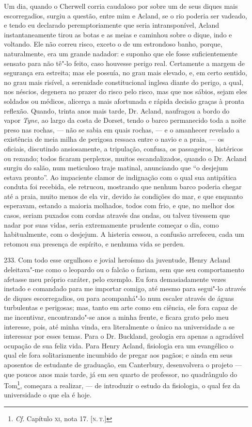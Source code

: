 Um dia, quando o Cherwell corria caudaloso por sobre um de seus diques
mais escorregadios, surgiu a questão, entre mim e Acland, se o rio
poderia ser vadeado, e tendo eu declarado peremptoriamente que seria
intransponível, Acland instantaneamente tirou as botas e as meias e
caminhou sobre o dique, indo e voltando. Ele não correu risco, exceto o
de um estrondoso banho, porque, naturalmente, era um grande nadador: e
suponho que ele fosse suficientemente sensato para não tê"-lo feito, caso
houvesse perigo real. Certamente a margem de segurança era estreita; mas
ele possuía, no grau mais elevado, e, em certo sentido, no grau mais
risível, a serenidade constitucional inglesa diante do perigo, a qual,
nos néscios, degenera no prazer do risco pelo risco, mas que nos sábios,
sejam eles soldados ou médicos, alicerça a mais afortunada e rápida
decisão graças à pronta reflexão. Quando, trinta anos mais tarde, Dr.
Acland, naufragou a bordo do vapor \emph{Tyne}, ao largo da costa de
Dorset, tendo o barco permanecido toda a noite preso nas rochas, --- não
se sabia em quais rochas, --- e o amanhecer revelado a existência de meia
milha de perigosa ressaca entre o navio e a praia, --- os oficiais,
discutindo ansiosamente, a tripulação, confusa, os passageiros,
histéricos ou rezando; todos ficaram perplexos, muitos escandalizados,
quando o Dr. Acland surgiu do salão, num meticuloso traje matinal,
anunciando que ``o desjejum estava pronto''. Ao impaciente clamor de
indignação com o qual sua antipática conduta foi recebida, ele retrucou,
mostrando que nenhum barco poderia chegar até a praia, muito menos de
ela vir, devido às condições do mar, e que enquanto esperavam, estando a
maioria molhados, todos com frio, e que, no melhor dos casos, seriam
puxados com cordas através das ondas, ou talvez tivessem que nadar por
suas vidas, seria extremamente prudente começar o dia, como
habitualmente, com o desjejum. A histeria cessou, a confusão arrefeceu,
cada um retomou sua presença de espírito, e nenhuma vida se perdeu.

233. Com todo esse orgulhoso e jovial heroísmo da juventude, Henry
Acland deleitava"-me como o leopardo ou o falcão o fariam, sem que seu
comportamento afetasse meu próprio caráter, pelo exemplo. Eu fora
demasiadamente vezes instado e comandado para me importar comigo, até
mesmo para segui"-lo através de diques escorregadios, ou para
acompanhá"-lo num escaler através de águas turbulentas e perigosas; mas,
tanto em arte como em ciência, ele fora capaz de me incentivar,
encontrando"-se anos a minha frente, e ficara grato pelo meu interesse,
pois, até minha vinda, era literalmente o único na universidade a se
interessar por esses temas. Para o Dr. Buckland, geologia era apenas a
agradável ocupação de sua feliz vida. Para Henry Acland, fisiologia era
um evangélico o qual ele fora solitariamente incumbido de pregar aos
pagãos; e ainda em seus aposentos de estudante de graduação, em
Canterbury, desenvolvera o projeto --- que poucos anos mais tarde, já em
seu quarto de professor, no quadrângulo do Tom\footnote{\emph{Cf.}
  Capítulo \textsc{xi}, nota 17. {[}\textsc{n.\,t.}{]}}, começara a realizar, --- de
introduzir o estudo da fisiologia, o qual fez da universidade o que ela
é hoje.

